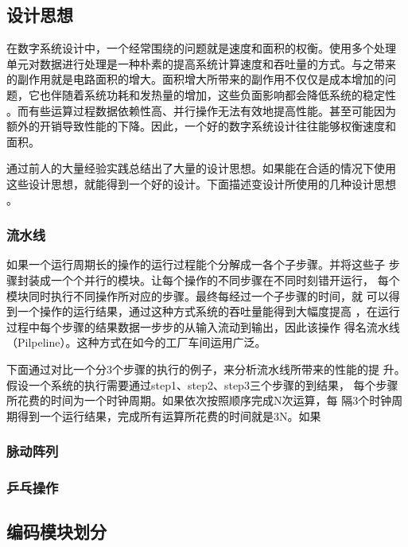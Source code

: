 \documentclass{article}
\numberwithin {equation}{section}
\begin{document}
\begin{spacing}{1.25}
  \subsection{设计思想}
    \vspace{1em}
    在数字系统设计中，一个经常围绕的问题就是速度和面积的权衡。使用多个处理
    单元对数据进行处理是一种朴素的提高系统计算速度和吞吐量的方式。与之带来
    的副作用就是电路面积的增大。面积增大所带来的副作用不仅仅是成本增加的问
    题，它也伴随着系统功耗和发热量的增加，这些负面影响都会降低系统的稳定性
    。而有些运算过程数据依赖性高、并行操作无法有效地提高性能。甚至可能因为
    额外的开销导致性能的下降。因此，一个好的数字系统设计往往能够权衡速度和
    面积。

    通过前人的大量经验实践总结出了大量的设计思想。如果能在合适的情况下使用
    这些设计思想，就能得到一个好的设计。下面描述变设计所使用的几种设计思想
    。
    \subsubsection{流水线}
      \vspace{1em}
      如果一个运行周期长的操作的运行过程能个分解成一各个子步骤。并将这些子
      步骤封装成一个个并行的模块。让每个操作的不同步骤在不同时刻错开运行，
      每个模块同时执行不同操作所对应的步骤。最终每经过一个子步骤的时间，就
      可以得到一个操作的运行结果，通过这种方式系统的吞吐量能得到大幅度提高
      ，在运行过程中每个步骤的结果数据一步步的从输入流动到输出，因此该操作
      得名流水线（Pilpeline）。这种方式在如今的工厂车间运用广泛。

      下面通过对比一个分3个步骤的执行的例子，来分析流水线所带来的性能的提
      升。假设一个系统的执行需要通过step1、step2、step3三个步骤的到结果，
      每个步骤所花费的时间为一个时钟周期。如果依次按照顺序完成N次运算，每
      隔3个时钟周期得到一个运行结果，完成所有运算所花费的时间就是3N。如果

      \subsubsection{脉动阵列}
      \vspace{1em}
    \subsubsection{乒乓操作}
      \vspace{1em}
  \subsection{编码模块划分}
    \vspace{1em}

\end{spacing}
\end{document}
